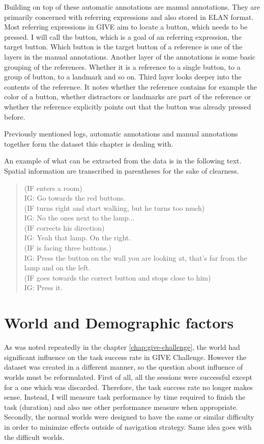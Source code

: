 Building on top of these automatic annotations are manual annotations. They are primarily concerned with referring expressions and also stored in ELAN format. Most referring expressions in GIVE aim to locate a button, which needs to be pressed. I will call the button, which is a goal of an referring expression, the target button. Which button is the target button of a reference is one of the layers in the manual annotations. Another layer of the annotations is some basic grouping of the references. Whether it is a reference to a single button, to a group of button, to a landmark and so on. Third layer looks deeper into the contents of the reference. It notes whether the reference contains for example the color of a button, whether distractors or landmarks are part of the reference or whether the reference explicitly points out that the button was already pressed before.

Previously mentioned logs, automatic annotations and manual annotations together form the dataset this chapter is dealing with.

An example of what can be extracted from the data is in the following text. Spatial information are transcribed in parentheses for the sake of clearness.

\begin{verse}
(IF enters a room)\\
IG: Go towards the red buttons.\\
(IF turns right and start walking, but he turns too much)\\
IG: No the ones next to the lamp...\\
(IF corrects his direction)\\
IG: Yeah that lamp. On the right.\\
(IF is facing three buttons.)\\
IG: Press the button on the wall you are looking at, that's far from the lamp and on the left. \\
(IF goes towards the correct button and stops close to him)\\
IG: Press it.\\
\end{verse}

\section{World and Demographic factors}
As was noted repeatedly in the chapter \ref{chap:give-challenge}, the world had significant influence on the task success rate in GIVE Challenge. However the dataset was created in a different manner, so the question about influence of worlds must be reformulated. First of all, all the sessions were successful except for a one which was discarded. Therefore, the task success rate no longer makes sense. Instead, I will measure task performance by time required to finish the task (duration) and also use other performance measure when appropriate. Secondly, the normal worlds were designed to have the same or similar difficulty in order to minimize effects outside of navigation strategy. Same idea goes with the difficult worlds.

